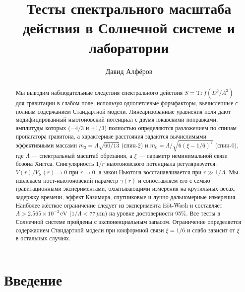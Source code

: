 \documentclass[aps,prd,twocolumn,superscriptaddress,nofootinbib,floatfix]{revtex4-2}
\begin{document}
\title{Тесты спектрального масштаба действия в Солнечной системе и лаборатории}

\author{Давид Алфёров}

\begin{abstract}
Мы выводим наблюдательные следствия спектрального действия
$S = \mathrm{Tr}\,f(D^2/\Lambda^2)$ для гравитации в слабом поле,
используя однопетлевые формфакторы, вычисленные с полным содержанием
Стандартной модели.
Линеаризованные уравнения поля дают модифицированный ньютоновский
потенциал с двумя юкавскими поправками, амплитуды которых ($-4/3$ и
$+1/3$) полностью определяются разложением по спинам пропагатора
гравитона, а характерные расстояния задаются вычислимыми эффективными
массами $m_2 = \Lambda\sqrt{60/13}$ (спин-2) и
$m_0 = \Lambda/\sqrt{6(\xi-1/6)^2}$ (спин-0), где $\Lambda$ ---
спектральный масштаб обрезания, а $\xi$ --- параметр неминимальной
связи бозона Хиггса.
Сингулярность $1/r$ ньютоновского потенциала регуляризуется:
$V(r)/V_\mathrm{N}(r) \to 0$ при $r \to 0$, а закон Ньютона
восстанавливается при $r \gg 1/\Lambda$.
Мы извлекаем пост-ньютоновский параметр $\gamma(r)$ и сопоставляем
его с семью гравитационными экспериментами, охватывающими измерения
на крутильных весах, задержку времени, эффект Казимира, спутниковые и
лунно-дальномерные измерения.
Наиболее жёсткое ограничение следует из эксперимента E\"ot-Wash и
составляет $\Lambda > 2.565 \times 10^{-3}\,\mathrm{eV}$
($1/\Lambda < 77\,\mu\mathrm{m}$) на уровне достоверности 95\%.
Все тесты в Солнечной системе пройдены с экспоненциальным
запасом.
Ограничение определяется содержанием Стандартной модели при
конформной связи $\xi = 1/6$ и слабо зависит от $\xi$ в остальных
случаях.
\end{abstract}


\maketitle


\section{Введение}
\label{sec:intro}
\end{document}
